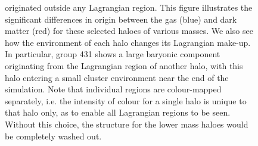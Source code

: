 \documentclass[fleqn,usenatbib]{mnras}
\begin{document}
\begin{figure}
{ originated outside any Lagrangian region. This figure illustrates the
 significant differences in origin between the gas (blue) and dark matter
 (red) for these selected haloes of various masses. We also see how the
 environment of each halo changes its Lagrangian make-up. In particular,
 group 431 shows a large baryonic component originating from the Lagrangian
 region of another halo, with this halo entering a small cluster environment
 near the end of the simulation. Note that individual regions are
 colour-mapped separately, i.e. the intensity of colour for a single halo is
 unique to that halo only, as to enable all Lagrangian regions to be seen.
 Without this choice, the structure for the lower mass haloes would be
 completely washed out.}
	\vspace{1cm}
	\label{fig:bigtransferpic}
\end{figure}
\end{document}
